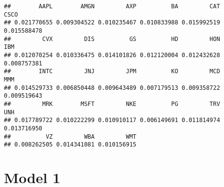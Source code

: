\documentclass[
]{article}
\newenvironment{Shaded}{\begin{snugshade}}{\end{snugshade}}
\newcommand{\AttributeTok}[1]{\textcolor[rgb]{0.13,0.29,0.53}{#1}}
\newcommand{\CommentTok}[1]{\textcolor[rgb]{0.56,0.35,0.01}{\textit{#1}}}
\newcommand{\ControlFlowTok}[1]{\textcolor[rgb]{0.13,0.29,0.53}{\textbf{#1}}}
\newcommand{\DecValTok}[1]{\textcolor[rgb]{0.00,0.00,0.81}{#1}}
\newcommand{\FunctionTok}[1]{\textcolor[rgb]{0.13,0.29,0.53}{\textbf{#1}}}
\newcommand{\NormalTok}[1]{#1}
\newcommand{\OtherTok}[1]{\textcolor[rgb]{0.56,0.35,0.01}{#1}}
\newcommand{\SpecialCharTok}[1]{\textcolor[rgb]{0.81,0.36,0.00}{\textbf{#1}}}
\newcommand{\StringTok}[1]{\textcolor[rgb]{0.31,0.60,0.02}{#1}}
\begin{document}
\begin{verbatim}
##        AAPL        AMGN         AXP          BA         CAT        CSCO 
## 0.021770655 0.009304522 0.010235467 0.010833988 0.015992519 0.015588478 
##         CVX         DIS          GS          HD         HON         IBM 
## 0.012070254 0.010336475 0.014101826 0.012120004 0.012432628 0.008757381 
##        INTC         JNJ         JPM          KO         MCD         MMM 
## 0.014529733 0.006850448 0.009643489 0.007179513 0.009358722 0.009519643 
##         MRK        MSFT         NKE          PG         TRV         UNH 
## 0.017789722 0.010222299 0.010910117 0.006149691 0.011814974 0.013716950 
##          VZ         WBA         WMT 
## 0.008262505 0.014341081 0.010156915
\end{verbatim}

\hypertarget{model-1}{%
\section{Model 1}\label{model-1}}

\begin{Shaded}
\end{Shaded}
\end{document}
